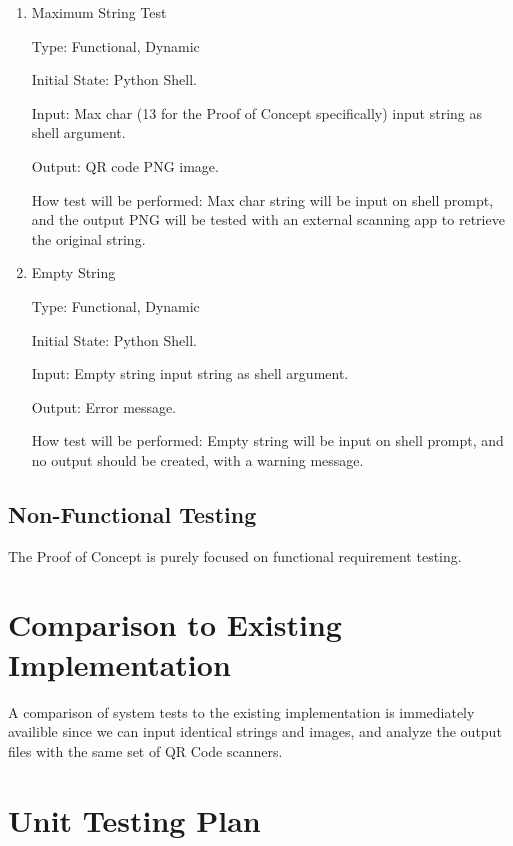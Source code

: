 \documentclass[12pt, titlepage]{article}
\begin{document}
\begin{enumerate}

\item{Maximum String Test\\}

Type: Functional, Dynamic
					
Initial State: Python Shell.
					
Input: Max char (13 for the Proof of Concept specifically) input string as shell argument.
					
Output: QR code PNG image.
					
How test will be performed: Max char string will be input on shell prompt, and the output PNG will be tested with an external scanning app to retrieve the original string.
					
\item{Empty String\\}

Type: Functional, Dynamic
					
Initial State: Python Shell.
					
Input: Empty string input string as shell argument.
					
Output: Error message.
					
How test will be performed: Empty string will be input on shell prompt, and no output should be created, with a warning message.

\end{enumerate}

\subsection{Non-Functional Testing}

The Proof of Concept is purely focused on functional requirement testing.
	
\section{Comparison to Existing Implementation}	

A comparison of system tests to the existing implementation is immediately availible since we can input identical strings and images, and analyze the output files with the same set of QR Code scanners.
				
\section{Unit Testing Plan}
\end{document}
